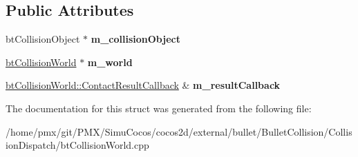 \subsection*{Public Attributes}
\begin{DoxyCompactItemize}
\item 
\mbox{\label{structbtSingleContactCallback_a83e0019896080e07b50fc9b4e91bc4ef}} 
bt\+Collision\+Object $\ast$ {\bfseries m\+\_\+collision\+Object}
\item 
\mbox{\label{structbtSingleContactCallback_ad69cfb32bb7f53413d7910e6cbe05542}} 
\hyperlink{classbtCollisionWorld}{bt\+Collision\+World} $\ast$ {\bfseries m\+\_\+world}
\item 
\mbox{\label{structbtSingleContactCallback_a847acf04fa01213638a783537d485362}} 
\hyperlink{structbtCollisionWorld_1_1ContactResultCallback}{bt\+Collision\+World\+::\+Contact\+Result\+Callback} \& {\bfseries m\+\_\+result\+Callback}
\end{DoxyCompactItemize}


The documentation for this struct was generated from the following file\+:\begin{DoxyCompactItemize}
\item 
/home/pmx/git/\+P\+M\+X/\+Simu\+Cocos/cocos2d/external/bullet/\+Bullet\+Collision/\+Collision\+Dispatch/bt\+Collision\+World.\+cpp\end{DoxyCompactItemize}

